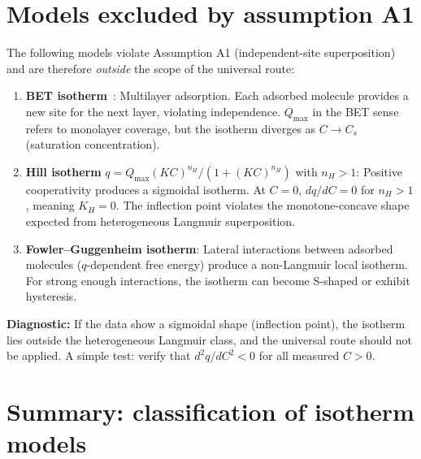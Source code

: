 \documentclass[12pt]{article}
\begin{document}
\section{Models excluded by assumption A1}
\label{sec:excluded}

The following models violate Assumption A1
(independent-site superposition) and are therefore \emph{outside}
the scope of the universal route:

\begin{enumerate}[nosep]
  \item \textbf{BET isotherm}~\cite{BET1938}:
        Multilayer adsorption.  Each adsorbed molecule provides a
        new site for the next layer, violating independence.
        $Q_{\max}$ in the BET sense refers to monolayer coverage,
        but the isotherm diverges as $C\to C_s$ (saturation
        concentration).

  \item \textbf{Hill isotherm}
        $q=Q_{\max}(KC)^{n_H}/(1+(KC)^{n_H})$ with $n_H>1$:
        Positive cooperativity produces a sigmoidal isotherm.
        At $C=0$, $dq/dC=0$ for $n_H>1$, meaning $K_H=0$.
        The inflection point violates the monotone-concave shape
        expected from heterogeneous Langmuir superposition.

  \item \textbf{Fowler--Guggenheim isotherm}:
        Lateral interactions between adsorbed molecules
        ($q$-dependent free energy) produce a non-Langmuir local
        isotherm.  For strong enough interactions, the isotherm
        can become S-shaped or exhibit hysteresis.
\end{enumerate}

\textbf{Diagnostic:}
If the data show a sigmoidal shape (inflection point), the isotherm
lies outside the heterogeneous Langmuir class, and the universal
route should not be applied.  A simple test: verify that $d^2 q/dC^2<0$
for all measured $C>0$.

\section{Summary: classification of isotherm models}
\label{sec:summary}
\end{document}
